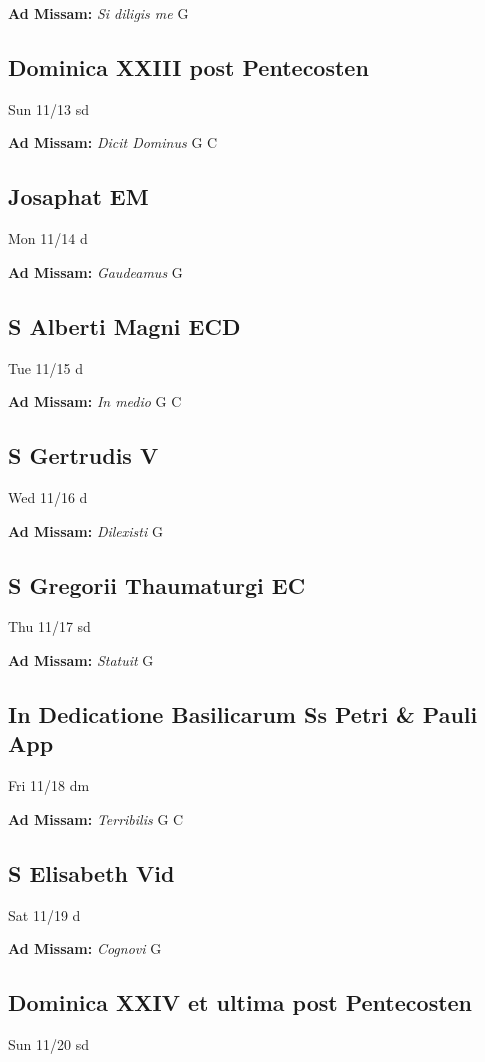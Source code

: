 \documentclass[letterpaper, 10pt, twocolumn]{article}
\begin{document}
\textbf{Ad Missam:} \textit{Si diligis me} G 

\subsection*{Dominica XXIII post Pentecosten}Sun 11/13 sd

\textbf{Ad Missam:} \textit{Dicit Dominus} G C 

\subsection*{Josaphat EM}Mon 11/14 d

\textbf{Ad Missam:} \textit{Gaudeamus} G 

\subsection*{S Alberti Magni ECD}Tue 11/15 d

\textbf{Ad Missam:} \textit{In medio} G C 

\subsection*{S Gertrudis V}Wed 11/16 d

\textbf{Ad Missam:} \textit{Dilexisti} G 

\subsection*{S Gregorii Thaumaturgi EC}Thu 11/17 sd

\textbf{Ad Missam:} \textit{Statuit} G 

\subsection*{In Dedicatione Basilicarum Ss Petri \& Pauli App}Fri 11/18 dm

\textbf{Ad Missam:} \textit{Terribilis} G C 

\subsection*{S Elisabeth Vid}Sat 11/19 d

\textbf{Ad Missam:} \textit{Cognovi} G 

\subsection*{Dominica XXIV et ultima post Pentecosten}Sun 11/20 sd
\end{document}
